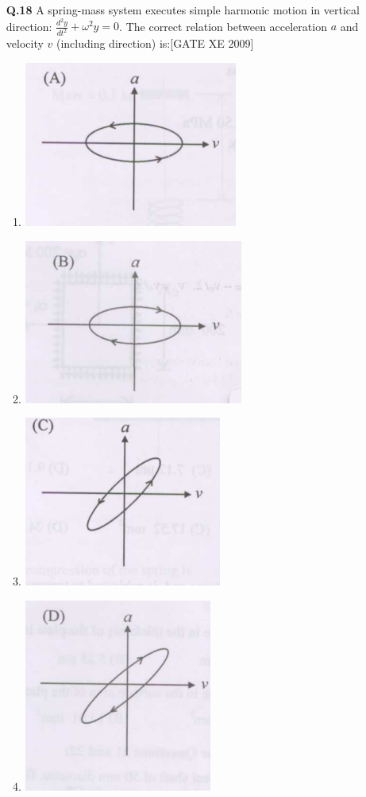 \documentclass[journal,12pt,onecolumn]{IEEEtran}
\theoremstyle{remark}
\begin{document}
\begin{enumerate}
\item[\textbf{Q.18}] A spring-mass system executes simple harmonic motion in vertical direction: $\frac{d^2 y}{dt^2} + \omega^2 y = 0$. The correct relation between acceleration $a$ and velocity $v$ (including direction) is:\hfill[GATE XE 2009]\\
\begin{multicols}{2}
\begin{enumerate} 
\item \includegraphics[width=0.4\columnwidth]{figs/fig20.png} \item \includegraphics[width=0.4\columnwidth]{figs/fig21.png}
      
\item \includegraphics[width=0.4\columnwidth]{figs/fig22.png}   \item \includegraphics[width=0.4\columnwidth]{figs/fig23.png}
    \\
\end{enumerate}
\end{multicols}
   \clearpage

\end{enumerate}
 
\end{document}
